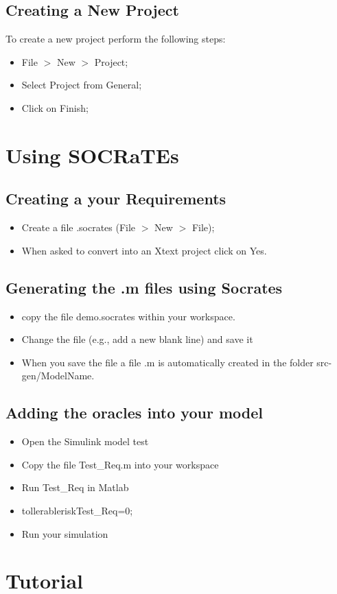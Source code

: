 \hypertarget{creating-a-new-project}{%
\subsection{Creating a New Project}\label{creating-a-new-project}}

To create a new project perform the following steps:

\begin{itemize}
\item
  File \(>\) New \(>\) Project;
\item
  Select Project from General;
\item
  Click on Finish;
\end{itemize}

\hypertarget{sec:using}{%
\section{Using SOCRaTEs}\label{sec:using}}

\hypertarget{creating-a-your-requirements}{%
\subsection{Creating a your
Requirements}\label{creating-a-your-requirements}}

\begin{itemize}
\item
  Create a file .socrates (File \(>\) New \(>\) File);
\item
  When asked to convert into an Xtext project click on Yes.
\end{itemize}

\hypertarget{generating-the-.m-files-using-socrates}{%
\subsection{Generating the .m files using
Socrates}\label{generating-the-.m-files-using-socrates}}

\begin{itemize}
\item
  copy the file demo.socrates within your workspace.
\item
  Change the file (e.g., add a new blank line) and save it
\item
  When you save the file a file .m is automatically created in the
  folder src-gen/ModelName.
\end{itemize}

\hypertarget{adding-the-oracles-into-your-model}{%
\subsection{Adding the oracles into your
model}\label{adding-the-oracles-into-your-model}}

\begin{itemize}
\item
  Open the Simulink model test
\item
  Copy the file Test\_Req.m into your workspace
\item
  Run Test\_Req in Matlab
\item
  tollerableriskTest\_Req=0;
\item
  Run your simulation
\end{itemize}

\hypertarget{sec:tutorial}{%
\section{Tutorial}\label{sec:tutorial}}
